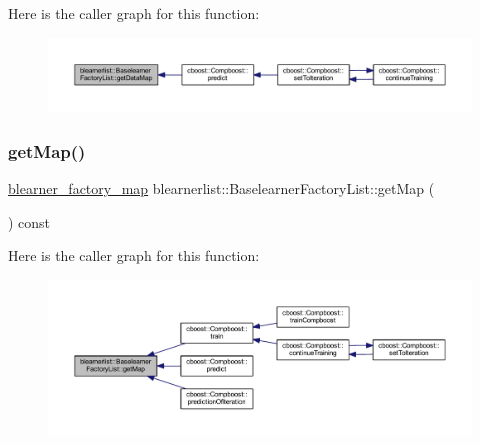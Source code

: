 Here is the caller graph for this function\+:
\nopagebreak
\begin{figure}[H]
\begin{center}
\leavevmode
\includegraphics[width=350pt]{classblearnerlist_1_1_baselearner_factory_list_aeb83b67769e5fb34e7acc14c7e651dfc_icgraph}
\end{center}
\end{figure}
\mbox{\label{classblearnerlist_1_1_baselearner_factory_list_aeb573190a689af611e2f80ca8ed65d95}} 
\subsubsection{\texorpdfstring{get\+Map()}{getMap()}}
{\footnotesize\ttfamily \mbox{\hyperlink{baselearner__factory__list_8h_a058570e00ae11b882cfed36eb40be025}{blearner\+\_\+factory\+\_\+map}} blearnerlist\+::\+Baselearner\+Factory\+List\+::get\+Map (\begin{DoxyParamCaption}{ }\end{DoxyParamCaption}) const}

Here is the caller graph for this function\+:
\nopagebreak
\begin{figure}[H]
\begin{center}
\leavevmode
\includegraphics[width=350pt]{classblearnerlist_1_1_baselearner_factory_list_aeb573190a689af611e2f80ca8ed65d95_icgraph}
\end{center}
\end{figure}
\mbox{\label{classblearnerlist_1_1_baselearner_factory_list_a1f0d601a978c0f50cf9b6228c1f92ce8}} 
